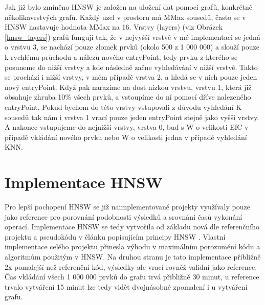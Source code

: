 \documentclass[czech,semestral,dept460,male,csharp,cpdeclaration]{diploma}
\begin{document}
		Jak již bylo zmíněno HNSW je založen na uložení dat pomocí grafů, konkrétně několikavrstvých grafů. Každý uzel v prostoru má MMax sousedů, často se v HNSW nastavuje hodnota MMax na 16. Vrstvy (layers) (viz Obrázek \ref{hnsw_layers}) grafů fungují tak, že v nejvyšší vrstvě v mé implementaci se jedná o vrstvu 3, se nachází pouze zlomek prvků (okolo 500 z 1 000 000) a slouží pouze k rychlému průchodu a nálezu nového entryPoint, tedy prvku z kterého se posuneme do nižší vrstvy a kde následně začne vyhledávání v nižší vrstvě. Takto se prochází i nižší vrstvy, v mém případě vrstva 2, a hledá se v nich pouze jeden nový entryPoint. Když pak narazíme na dost nízkou vrstvu, vrstvu 1, která již obsahuje zhruba 10\% všech prvků, a vstoupíme do ní pomocí dříve nalezeného entryPoint. Pokud bychom do této vrstvy vstupovali z důvodu vyhledání K sousedů tak nám i vrstva 1 vrací pouze jeden entryPoint stejně jako vyšší vrstvy. A nakonec vstupujeme do nejnižší vrstvy, vrstva 0, buď s W o velikosti EfC v případě vkládání nového prvku nebo W o velikosti jedna v případě vyhledání KNN.
		
		\section{Implementace HNSW}
		
		Pro lepší pochopení HNSW se již naimplementované projekty \cite{git-hnswlib} \cite{git-hnsw} využívaly pouze jako reference pro porovnání podobnosti výsledků a srovnání časů vykonání operací. Implementace HNSW se tedy vytvořila od základu nová dle referenčního projektu a pseudokódu v článku popisujícím principy HNSW \cite{malkov2018efficient}. Vlastní implementace celého projektu přinesla výhodu v maximálním porozumění kódu a algoritmům použitým v HNSW. Na druhou stranu je tato implementace přibližně 2x pomalejší než referenční kód, výsledky ale vrací rovněž validní jako reference. Čas vkládání všech 1 000 000 prvků do grafu trvá přibližně 30 minut, u reference trvalo vytváření 15 minut lze tedy vidět dvojnásobné zpomalení i u vytváření grafu.
		
\end{document}
